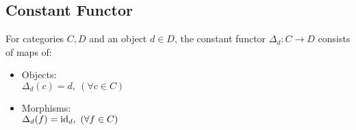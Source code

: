\subsection{Constant Functor}
\begin{definition}
  For categories $C,D$ and an object $d\in D$, the constant functor $\Delta_d:
  C\to D$ consists of maps of: \parencite{awodey:category_theory}
  \begin{itemize}
    \item Objects:\\
      $\Delta_d(c) = d,\ (\forall c\in C)$
    \item Morphisms:\\
      $\Delta_d(f) = \mathrm{id}_d,\ (\forall f\in C)$
  \end{itemize}
\end{definition}
